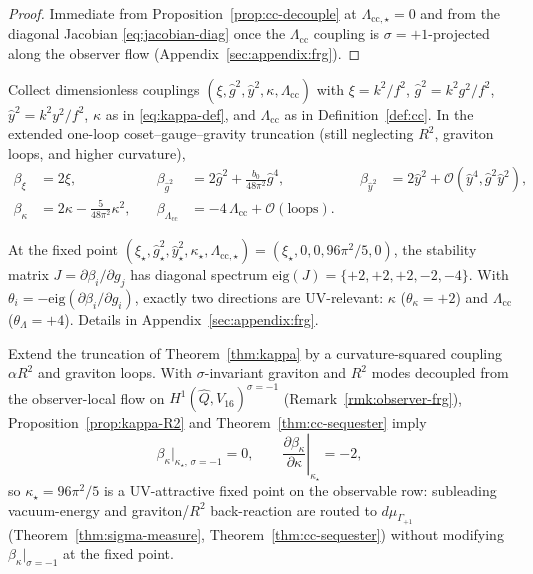 \begin{proof}
Immediate from Proposition~\ref{prop:cc-decouple} at
$\Lambda_{\mathrm{cc},\star}=0$ and from the diagonal Jacobian
\eqref{eq:jacobian-diag} once the $\Lambda_{\mathrm{cc}}$ coupling is
$\sigma=+1$-projected along the observer flow
(Appendix~\ref{sec:appendix:frg}).
\end{proof}

Collect dimensionless couplings
$(\xi,\hat g^2,\hat y^2,\kappa,\Lambda_{\mathrm{cc}})$ with
$\xi=k^2/f^2$, $\hat g^2=k^2 g^2/f^2$, $\hat y^2=k^2 y^2/f^2$,
$\kappa$ as in \eqref{eq:kappa-def}, and $\Lambda_{\mathrm{cc}}$ as in
Definition~\ref{def:cc}. In the extended one-loop coset--gauge--gravity
truncation (still neglecting $R^2$, graviton loops, and higher curvature),
\begin{equation}\label{eq:frg-system}
\begin{aligned}
  \beta_{\xi}&=2\xi,
  &\quad
  \beta_{\hat g^2}&=2\hat g^2+\frac{b_0}{48\pi^2}\hat g^4,
  &\quad
  \beta_{\hat y^2}&=2\hat y^2+\mathcal{O}(\hat y^4,\hat g^2\hat y^2),
  \\[4pt]
  \beta_{\kappa}&=2\kappa-\frac{5}{48\pi^2}\kappa^2,
  &\quad
  \beta_{\Lambda_{\mathrm{cc}}}&=-4\,\Lambda_{\mathrm{cc}}+\mathcal{O}(\text{loops}).
\end{aligned}
\end{equation}

\begin{proposition}
\label{prop:frg-jacobian}
At the fixed point
$(\xi_\star,\hat g^2_\star,\hat y^2_\star,\kappa_\star,\Lambda_{\mathrm{cc},\star})
=(\xi_\star,0,0,96\pi^2/5,0)$, the stability matrix
$J=\partial\beta_i/\partial g_j$ has diagonal spectrum
$\mathrm{eig}(J)=\{+2,+2,+2,-2,-4\}$. With
$\theta_i=-\mathrm{eig}(\partial\beta_i/\partial g_i)$, exactly two directions
are UV-relevant: $\kappa$ ($\theta_\kappa=+2$) and
$\Lambda_{\mathrm{cc}}$ ($\theta_{\Lambda}=+4$). Details in
Appendix~\ref{sec:appendix:frg}.
\end{proposition}

\begin{theorem}
\label{thm:kappa-persistence}
Extend the truncation of Theorem~\ref{thm:kappa} by a curvature-squared
coupling $\alpha R^2$ and graviton loops. With
$\sigma$-invariant graviton and $R^2$ modes decoupled from the observer-local
flow on $H^1(\hat Q,V_{16})^{\sigma=-1}$
(Remark~\ref{rmk:observer-frg}), Proposition~\ref{prop:kappa-R2} and
Theorem~\ref{thm:cc-sequester} imply
\begin{equation}\label{eq:kappa-persist}
  \beta_\kappa\Big|_{\kappa_\star,\,\sigma=-1}=0,
  \qquad
  \left.\frac{\partial\beta_\kappa}{\partial\kappa}\right|_{\kappa_\star}=-2,
\end{equation}
so $\kappa_\star=96\pi^2/5$ is a UV-attractive fixed point on the observable
row: subleading vacuum-energy and graviton/$R^2$ back-reaction are routed to
$d\mu_{\Gamma_{+1}}$ (Theorem~\ref{thm:sigma-measure},
Theorem~\ref{thm:cc-sequester}) without modifying
$\beta_\kappa|_{\sigma=-1}$ at the fixed point.
\end{theorem}

